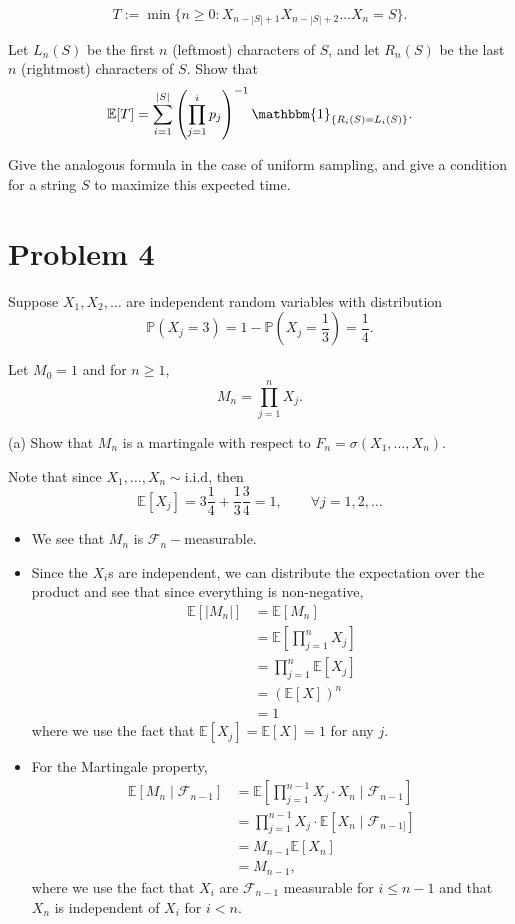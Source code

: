 \documentclass[11pt]{article}
\newcommand{\bbE}{\mathbb{E}}
\begin{document}
\[
T := \min\{n \geq 0 : X_{n-|S|+1} X_{n-|S|+2} \ldots X_n = S\}.
\]

Let \(L_n(S)\) be the first \(n\) (leftmost) characters of \(S\), and let \(R_n(S)\) be the last \(n\) (rightmost) characters of \(S\). Show that
\[
\mathbb{E}[T] = \sum_{i=1}^{|S|} \left(\prod_{j=1}^i p_j \right)^{-1} \mathbbm{1}_{\{R_i(S) = L_i(S)\}}.
\]

Give the analogous formula in the case of uniform sampling, and give a condition for a string \(S\) to maximize this expected time.

\newpage

\section*{Problem 4}
Suppose \(X_1, X_2, \ldots\) are independent random variables with distribution
\[
\mathbb{P}(X_j = 3) = 1 - \mathbb{P}\left(X_j = \frac{1}{3}\right) = \frac{1}{4}.
\]

Let \(M_0 = 1\) and for \(n \geq 1\),
\[
M_n = \prod_{j=1}^n X_j.
\]

(a) Show that \(M_n\) is a martingale with respect to \(F_n = \sigma(X_1, \ldots, X_n)\).
\begin{solution}
Note that since $X_1, \dots, X_n \sim \text{i.i.d}$, then 
\[\bbE[X_j] = 3\frac{1}{4} + \frac{1}{3}\frac{3}{4} = 1, \qquad \forall j  = 1,2,\dots\]
\begin{itemize}
    \item We see that $M_n$ is $\mathcal{F}_n-$measurable.
    \item Since the $X_i$s are independent, we can distribute the expectation over the product and see that  since everything is non-negative,
    \begin{align*}
        \bbE[|M_n|] &= \bbE[M_n]\\
        &= \bbE\left[\prod_{j=1}^n X_j\right]\\
        &= \prod_{j=1}^n\bbE[X_j]\\
        &= (\bbE[X])^n\\
        &= 1
    \end{align*} where we use the fact that $\bbE[X_j] = \bbE[X] = 1$ for any $j.$ 
    \item For the Martingale property, 
    \begin{align*}
        \bbE[M_n \mid \mathcal{F}_{n-1}]
        &= \bbE\left[\prod_{j=1}^{n-1}X_{j}\cdot  X_n\mid \mathcal{F}_{n-1}\right]\\
        &= \prod_{j=1}^{n-1}X_j \cdot \bbE[X_n \mid \mathcal{F}_{n-1]}]\\
        &= M_{n-1}\bbE[X_n]\\
        &= M_{n-1},
    \end{align*}
    where we use the fact that $X_i$ are $\mathcal{F}_{n-1}$ measurable for $i\leq n-1$ and that $X_n$ is independent of $X_i$ for $i< n.$
\end{itemize}



\end{solution}
\end{document}

